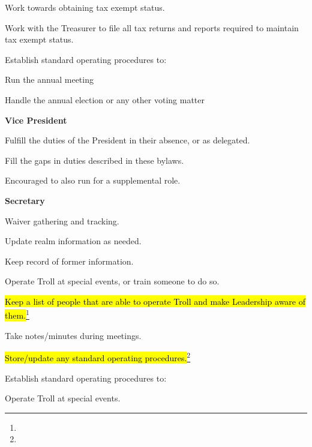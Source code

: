 \documentclass[12pt]{article}
\newcommand{\newpart}[2][]{\hl{#2}\expandafter\ifx\expandafter\relax\detokenize{#1}\relax\else\textnormal{\footnote{#1}}\fi}
\begin{document}
\begin{level}
\begin{level}
\begin{level}
            \item Work towards obtaining tax exempt status.
            \item Work with the Treasurer to file all tax returns and reports required to maintain tax exempt status.
            \item Establish standard operating procedures to:
            \begin{level}
                \item Run the annual meeting
                \item Handle the annual election or any other voting matter
            \end{level}
        \end{level}
        \item \textbf{Vice President}
        \begin{level}
            \item Fulfill the duties of the President in their absence, or as delegated.
            \item Fill the gaps in duties described in these bylaws.
            \item Encouraged to also run for a supplemental role.
        \end{level}
        \item \textbf{Secretary}
        \begin{level}
            \item Waiver gathering and tracking.
            \item Update realm information as needed.
            \item Keep record of former information.
            \item Operate Troll at special events, or train someone to do so.
            \begin{level}
                \item \newpart{Keep a list of people that are able to operate Troll and make Leadership aware of them.}
            \end{level}
            \item Take notes/minutes during meetings.
            \item \newpart{Store/update any standard operating procedures.}
            \item Establish standard operating procedures to:
            \begin{level}
                \item Operate Troll at special events.
            \end{level}

\end{level}
\end{level}
\end{level}
\end{document}
